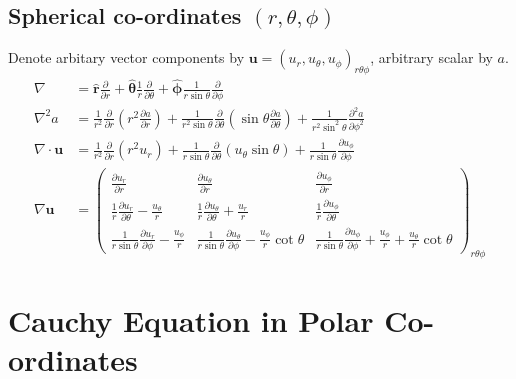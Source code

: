 \documentclass{jknotes}
\begin{document}
\subsection{Spherical co-ordinates $(r,\theta,\phi)$}
Denote arbitary vector components by $\symbf{u} = (u_r, u_\theta,
u_\phi)_{r\theta\phi}$, arbitrary scalar by $a$.
\begingroup
\addtolength{\jot}{.7em}
\renewcommand*{\arraystretch}{2}
\setlength\arraycolsep{.7em}
\begin{align}
	\nabla &= \hat{\symbf{r}} \frac{\partial}{\partial r} +
	\hat{\symbf{\theta}} \frac{1}{r}\frac{\partial}{\partial \theta} +
	\hat{\symbf{\phi}} \frac{1}{r\sin \theta} \frac{\partial}{\partial \phi}
	\\
	\nabla^2 a &= \frac{1}{r^2} \frac{\partial}{\partial r} \left( r^2
	\frac{\partial a}{\partial r} \right) + \frac{1}{r^2 \sin \theta}
	\frac{\partial}{\partial \theta} \left( \sin \theta \frac{\partial
	a}{\partial \theta} \right) + \frac{1}{r^2 \sin^2 \theta}
	\frac{\partial^2 a}{\partial \phi^2} \\
	\nabla \cdot \symbf{u} &= \frac{1}{r^2} \frac{\partial}{\partial r}(r^2
	u_r) + \frac{1}{r\sin\theta} \frac{\partial}{\partial \theta} (u_\theta
	\sin \theta) + \frac{1}{r\sin\theta}\frac{\partial u_\phi}{\partial \phi} \\
	\nabla \symbf{u} &= \begin{pmatrix}
		\frac{\partial u_r}{\partial r} & 
		\frac{\partial u_\theta}{\partial r} &
		\frac{\partial u_\phi}{\partial r} \\
		\frac{1}{r}\frac{\partial u_r}{\partial \theta} - \frac{u_\theta}{r} &
		\frac{1}{r}\frac{\partial u_\theta}{\partial \theta} + \frac{u_r}{r} &
		\frac{1}{r}\frac{\partial u_\phi}{\partial \theta} \\
		\frac{1}{r\sin\theta} \frac{\partial u_r}{\partial \phi} -
		\frac{u_\phi}{r} & 
		\frac{1}{r\sin\theta} \frac{\partial u_\theta}{\partial \phi} -
		\frac{u_\phi}{r}\cot \theta & 
		\frac{1}{r\sin\theta} \frac{\partial u_\phi}{\partial \phi} +
		\frac{u_\phi}{r} + \frac{u_\theta}{r}\cot\theta
	\end{pmatrix}_{r\theta\phi}
\end{align}
\endgroup

\newpage
\section{Cauchy Equation in Polar Co-ordinates}
\end{document}
